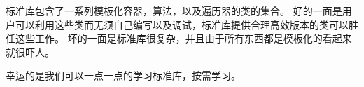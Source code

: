 \documentclass[../../LearnCpp.tex]{subfiles}
\begin{document}

标准库包含了一系列模板化容器，算法，以及遍历器的类的集合。
好的一面是用户可以利用这些类而无须自己编写以及调试，标准库提供合理高效版本的类可以胜任这些工作。
坏的一面是标准库很复杂，并且由于所有东西都是模板化的看起来就很吓人。

幸运的是我们可以一点一点的学习标准库，按需学习。
\end{document}
